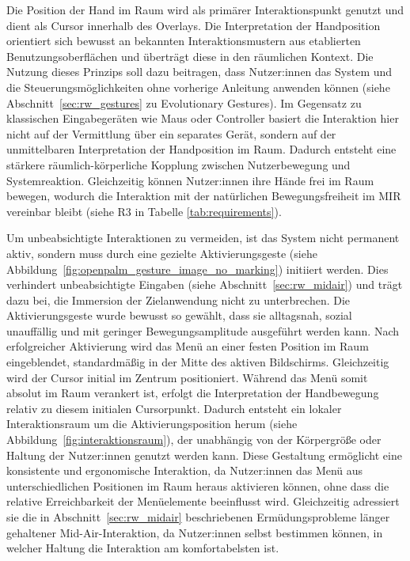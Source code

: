 Die Position der Hand im Raum wird als primärer Interaktionspunkt genutzt und dient als Cursor innerhalb des Overlays. Die Interpretation der Handposition orientiert sich bewusst an bekannten Interaktionsmustern aus etablierten Benutzungsoberflächen und überträgt diese in den räumlichen Kontext. Die Nutzung dieses Prinzips soll dazu beitragen, dass Nutzer:innen das System und die Steuerungsmöglichkeiten ohne vorherige Anleitung anwenden können (siehe Abschnitt~\ref{sec:rw_gestures} zu Evolutionary Gestures).
Im Gegensatz zu klassischen Eingabegeräten wie Maus oder Controller basiert die Interaktion hier nicht auf der Vermittlung über ein separates Gerät, sondern auf der unmittelbaren Interpretation der Handposition im Raum. Dadurch entsteht eine stärkere räumlich-körperliche Kopplung zwischen Nutzerbewegung und Systemreaktion. Gleichzeitig können Nutzer:innen ihre Hände frei im Raum bewegen, wodurch die Interaktion mit der natürlichen Bewegungsfreiheit im MIR vereinbar bleibt (siehe R3 in Tabelle \ref{tab:requirements}).

Um unbeabsichtigte Interaktionen zu vermeiden, ist das System nicht permanent aktiv, sondern muss durch eine gezielte Aktivierungsgeste (siehe Abbildung~\ref{fig:openpalm_gesture_image_no_marking}) initiiert werden. Dies verhindert unbeabsichtigte Eingaben (siehe Abschnitt~\ref{sec:rw_midair}) und trägt dazu bei, die Immersion der Zielanwendung nicht zu unterbrechen. Die Aktivierungsgeste wurde bewusst so gewählt, dass sie alltagsnah, sozial unauffällig und mit geringer Bewegungsamplitude ausgeführt werden kann.
Nach erfolgreicher Aktivierung wird das Menü an einer festen Position im Raum eingeblendet, standardmäßig in der Mitte des aktiven Bildschirms. Gleichzeitig wird der Cursor initial im Zentrum positioniert. Während das Menü somit absolut im Raum verankert ist, erfolgt die Interpretation der Handbewegung relativ zu diesem initialen Cursorpunkt.
Dadurch entsteht ein lokaler Interaktionsraum um die Aktivierungsposition herum (siehe Abbildung~\ref{fig:interaktionsraum}), der unabhängig von der Körpergröße oder Haltung der Nutzer:innen genutzt werden kann. Diese Gestaltung ermöglicht eine konsistente und ergonomische Interaktion, da Nutzer:innen das Menü aus unterschiedlichen Positionen im Raum heraus aktivieren können, ohne dass die relative Erreichbarkeit der Menüelemente beeinflusst wird. Gleichzeitig adressiert sie die in Abschnitt~\ref{sec:rw_midair} beschriebenen Ermüdungsprobleme länger gehaltener Mid-Air-Interaktion, da Nutzer:innen selbst bestimmen können, in welcher Haltung die Interaktion am komfortabelsten ist.

